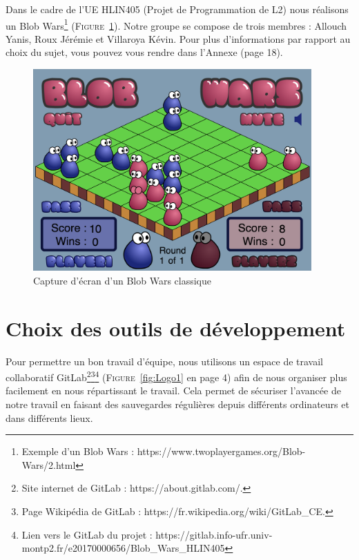 \documentclass[11pt,a4paper]{article}
\begin{document}
Dans le cadre de l'UE HLIN405 (Projet de Programmation de L2) nous réalisons un Blob Wars\footnote{Exemple d'un Blob Wars : https://www.twoplayergames.org/Blob-Wars/2.html} (\textsc{Figure}~\ref{fig:Screenshot1}). Notre groupe se compose de trois membres : Allouch Yanis, Roux Jérémie et Villaroya Kévin. Pour plus d'informations par rapport au choix du sujet, vous pouvez vous rendre dans l'Annexe (page 18).

\begin{figure}[h]
\begin{center}
\includegraphics[width=0.95\textwidth]{figures/capture_ecran}
\caption{Capture d'écran d'un Blob Wars classique}
\label{fig:Screenshot1}
\end{center}
\end{figure}


\setcounter{section}{0}
\vspace{-10px}
\section{Choix des outils de développement}

Pour permettre un bon travail d'équipe, nous utilisons un espace de travail collaboratif GitLab\footnote{Site internet de GitLab : https://about.gitlab.com/.}\footnote{Page Wikipédia de GitLab : https://fr.wikipedia.org/wiki/GitLab\_CE.}\footnote{Lien vers le GitLab du projet : https://gitlab.info-ufr.univ-montp2.fr/e20170000656/Blob\_Wars\_HLIN405}  (\textsc{Figure}~\ref{fig:Logo1} en page 4) afin de nous organiser plus facilement en nous répartissant le travail. Cela permet de sécuriser l'avancée de notre travail en faisant des sauvegardes régulières depuis différents ordinateurs et dans différents lieux.\\
\end{document}
